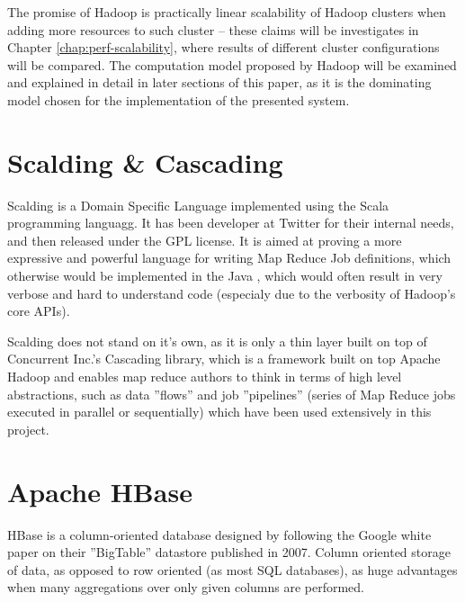 The promise of Hadoop is practically linear scalability of Hadoop clusters when adding more resources to such cluster -- these claims will be investigates in Chapter \ref{chap:perf-scalability}, where results of different cluster configurations will be compared. The computation model proposed by Hadoop will be examined and explained in detail in later sections of this paper, as it is the dominating model chosen for the implementation of the presented system.

\section{Scalding \& Cascading}
\label{sec:scalding-info}

Scalding \cite{scalding} is a Domain Specific Language implemented using the Scala \cite{scala} programming languagg. It has been developer at Twitter \cite{twitter} for their internal needs, and then released under the GPL license. It is aimed at proving a more expressive and powerful language for writing Map Reduce Job definitions, which otherwise
would be implemented in the Java \cite{java}, which would often result in very verbose and hard to understand code (especialy due to the verbosity of Hadoop's core APIs).

Scalding does not stand on it's own, as it is only a thin layer built on top of Concurrent Inc.'s \cite{concurrent-inc} Cascading library, which is a framework built on top Apache Hadoop and enables map reduce authors to think in terms of high level abstractions, such as data ''flows'' 
and job ''pipelines'' (series of Map Reduce jobs executed in parallel or sequentially) which have been used extensively in this project.



\section{Apache HBase}
\label{sec:hbase}

HBase is a column-oriented database \cite{columnar-database} designed by following the Google white paper on their ''BigTable'' datastore published in 2007.
Column oriented storage of data, as opposed to row oriented (as most SQL databases), as huge advantages when many aggregations over only given columns are performed.

